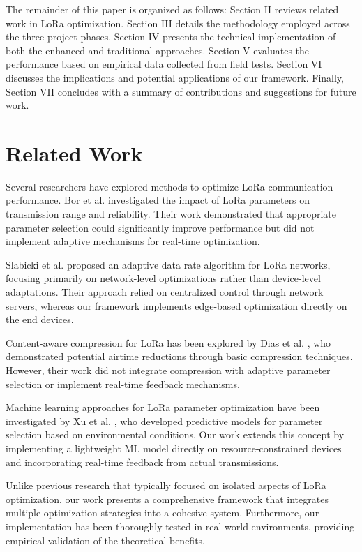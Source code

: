 \documentclass[conference]{IEEEtran}
\begin{document}
The remainder of this paper is organized as follows: Section II reviews related work in LoRa optimization. Section III details the methodology employed across the three project phases. Section IV presents the technical implementation of both the enhanced and traditional approaches. Section V evaluates the performance based on empirical data collected from field tests. Section VI discusses the implications and potential applications of our framework. Finally, Section VII concludes with a summary of contributions and suggestions for future work.

\section{Related Work}
Several researchers have explored methods to optimize LoRa communication performance. Bor et al. \cite{bor2016lora} investigated the impact of LoRa parameters on transmission range and reliability. Their work demonstrated that appropriate parameter selection could significantly improve performance but did not implement adaptive mechanisms for real-time optimization.

Slabicki et al. \cite{slabicki2018adaptive} proposed an adaptive data rate algorithm for LoRa networks, focusing primarily on network-level optimizations rather than device-level adaptations. Their approach relied on centralized control through network servers, whereas our framework implements edge-based optimization directly on the end devices.

Content-aware compression for LoRa has been explored by Dias et al. \cite{dias2020compression}, who demonstrated potential airtime reductions through basic compression techniques. However, their work did not integrate compression with adaptive parameter selection or implement real-time feedback mechanisms.

Machine learning approaches for LoRa parameter optimization have been investigated by Xu et al. \cite{xu2019machine}, who developed predictive models for parameter selection based on environmental conditions. Our work extends this concept by implementing a lightweight ML model directly on resource-constrained devices and incorporating real-time feedback from actual transmissions.

Unlike previous research that typically focused on isolated aspects of LoRa optimization, our work presents a comprehensive framework that integrates multiple optimization strategies into a cohesive system. Furthermore, our implementation has been thoroughly tested in real-world environments, providing empirical validation of the theoretical benefits.
\end{document}
